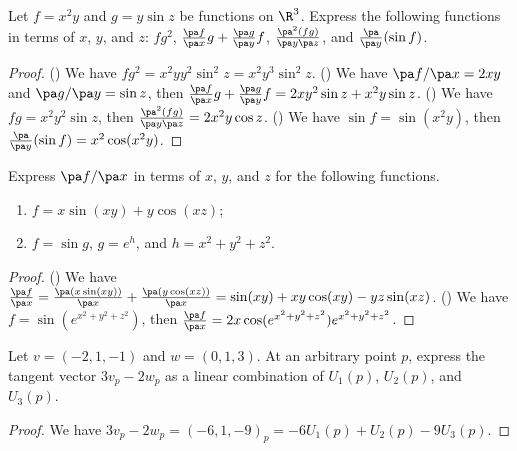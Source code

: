 \newpage
{}
\begin{exercise}[1.1.1]
    Let $f={x}^{2}y$ and $g=y\sin z$ be functions on ${\R}^{3}$. Express the following functions in terms of $x$, $y$, and $z$: $f{g}^{2}$, $\frac{\pa f}{\pa x}g+\frac{\pa g}{\pa y}f$, $\frac{{\pa}^{2}(fg)}{\pa y\pa z}$, and $\frac{\pa}{\pa y}(\sin f)$.
\end{exercise}
\begin{proof}
    () We have $f{g}^{2}={x}^{2}y{y}^{2}{\sin}^{2}z={x}^{2}{y}^{3}{\sin}^{2}z$. () We have $\pa f/\pa x=2xy$ and $\pa g/\pa y=\sin z$, then $\frac{\pa f}{\pa x}g+\frac{\pa g}{\pa y}f=2x{y}^{2}\sin z+{x}^{2}y\sin z$. () We have $fg={x}^{2}{y}^{2}\sin z$, then $\frac{{\pa}^{2}(fg)}{\pa y\pa z}=2{x}^{2}y\cos z$. () We have $\sin f=\sin({x}^{2}y)$, then $\frac{\pa}{\pa y}(\sin f)={x}^{2}\cos({x}^{2}y)$.
\end{proof}
\begin{exercise}[1.1.3]
    Express $\pa f/\pa x$ in terms of $x$, $y$, and $z$ for the following functions.
    \begin{enumerate}
        \item $f=x\sin(xy)+y\cos(xz)$;
        \item $f=\sin g$, $g={e}^{h}$, and $h={x}^{2}+{y}^{2}+{z}^{2}$.
    \end{enumerate}
\end{exercise}
\begin{proof}
    () We have $\frac{\pa f}{\pa x}=\frac{\pa(x\sin(xy))}{\pa x}+\frac{\pa(y\cos(xz))}{\pa x}=\sin(xy)+xy\cos(xy)-yz\sin(xz)$. () We have $f=\sin({e}^{{x}^{2}+{y}^{2}+{z}^{2}})$, then $\frac{\pa f}{\pa x}=2x\cos({e}^{{x}^{2}+{y}^{2}+{z}^{2}}){e}^{{x}^{2}+{y}^{2}+{z}^{2}}$.
\end{proof}



\begin{exercise}[1.2.1]
    Let $v=(-2,1,-1)$ and $w=(0,1,3)$. At an arbitrary point $p$, express the tangent vector $3{v}_{p}-2{w}_{p}$ as a linear combination of ${U}_{1}(p)$, ${U}_{2}(p)$, and ${U}_{3}(p)$.
\end{exercise}
\begin{proof}
    We have $3{v}_{p}-2{w}_{p}={(-6,1,-9)}_{p}=-6{U}_{1}(p)+{U}_{2}(p)-9{U}_{3}(p)$.
\end{proof}


